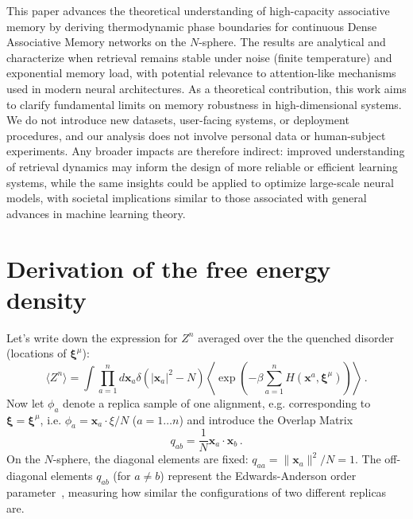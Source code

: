 \documentclass{article}
\theoremstyle{plain}
\theoremstyle{definition}
\theoremstyle{remark}
\begin{document}
This paper advances the theoretical understanding of high-capacity associative memory by deriving thermodynamic phase boundaries for continuous Dense Associative Memory networks on the $N$-sphere. The results are analytical and characterize when retrieval remains stable under noise (finite temperature) and exponential memory load, with potential relevance to attention-like mechanisms used in modern neural architectures. As a theoretical contribution, this work aims to clarify fundamental limits on memory robustness in high-dimensional systems. We do not introduce new datasets, user-facing systems, or deployment procedures, and our analysis does not involve personal data or human-subject experiments. Any broader impacts are therefore indirect: improved understanding of retrieval dynamics may inform the design of more reliable or efficient learning systems, while the same insights could be applied to optimize large-scale neural models, with societal implications similar to those associated with general advances in machine learning theory.



\nocite{langley00}




\newpage
\appendix
\onecolumn
\section{Derivation of the free energy density}

Let's write down the expression for $Z^n$ averaged over the the quenched disorder (locations of $\bm{\xi}^\mu$):
\begin{equation}
    \langle Z^n \rangle = \int \prod_{a=1}^n d\bm{x}_a \delta(|\bm{x}_a|^2 - N) \left\langle \exp\left(-\beta \sum_{a=1}^n H(\bm{x}^a, \bm{\xi}^\mu)\right) \right\rangle\,.
    \label{eq:Zn}
\end{equation}
Now let $\phi_a$ denote a replica sample of one alignment, e.g. corresponding to $\bm{\xi} = \bm{\xi}^\mu$, i.e. $\phi_a = \bm{x}_a \cdot \xi /N$ ($a=1\dots n$) and introduce the Overlap Matrix 
\begin{equation}
    q_{ab} = \frac{1}{N} \bm{x}_a \cdot \bm{x}_b\,.
\end{equation}
On the $N$-sphere, the diagonal elements are fixed: $q_{aa} =  \|\bm{x}_a\|^2/N = 1$. The off-diagonal elements $q_{ab}$ (for $a \neq b$) represent the Edwards-Anderson order parameter~\cite{ea75}, measuring how similar the configurations of two different replicas are.
\end{document}

